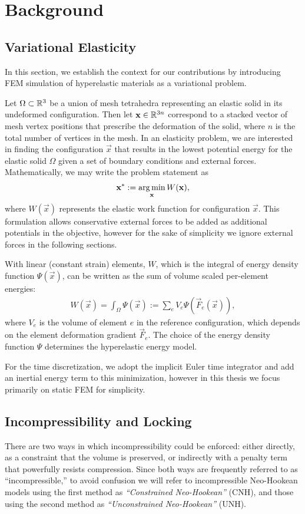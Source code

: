 \chapter{Background}
\label{ch:Background}

\section{Variational Elasticity}
In this section, we establish the context for our contributions by introducing FEM simulation of
hyperelastic materials as a variational problem.

Let $\Omega \subset \mathbb{R}^{3}$ be a union of mesh tetrahedra representing an elastic solid in its
undeformed configuration. Then let $\mathbf{x} \in \mathbb{R}^{3n}$ correspond to a stacked vector of mesh vertex
positions that prescribe the deformation of the solid, where $n$ is the total number of vertices
in the mesh. In an elasticity problem, we are
interested in finding the configuration $\vec{x}$ that results in the lowest potential energy
for the elastic solid $\Omega$ given a set of boundary conditions
and external forces. Mathematically, we may write the problem statement as
\begin{align}
\mathbf{x}^* := \operatorname*{arg\,min}_{\mathbf{x}} W(\mathbf{x}),
\label{eq:energy_min}
\end{align}
where $W(\vec{x})$ represents the elastic work function for configuration $\vec{x}$. 
This formulation allows conservative external forces to be added as additional potentials in the
objective, however for the sake of simplicity we ignore external forces in the following sections.

With linear (constant strain) elements, $W$, which is the integral of energy density function $\Psi(\vec{x})$, can be written as the sum of volume scaled per-element energies:
\begin{align}
W(\vec{x}) = \int_{\Omega} \Psi(\vec{x}) := \sum_{e} V_{e} \Psi(\vec{F}_e(\vec{x})),
\label{eq:total_energy}
\end{align}
where $V_e$ is the volume of element $e$ in the reference configuration, which depends on the element deformation gradient $\vec{F}_e$.  The choice of the energy density function $\Psi$ determines the hyperelastic energy model. 

For the time discretization, we adopt the implicit Euler time integrator and add an inertial
energy term to this minimization, however in this thesis we focus primarily on static FEM for
simplicity. 

\section{Incompressibility and Locking}
There are two ways in which incompressibility could be enforced: either directly, as a constraint that the volume is preserved, or indirectly with a penalty term that powerfully resists compression. Since both ways are frequently referred to as ``incompressible,'' to avoid confusion we will refer to incompressible Neo-Hookean models using the first method as {\em ``Constrained Neo-Hookean''} (CNH), and those using the second method as
{\em ``Unconstrained Neo-Hookean''} (UNH).

